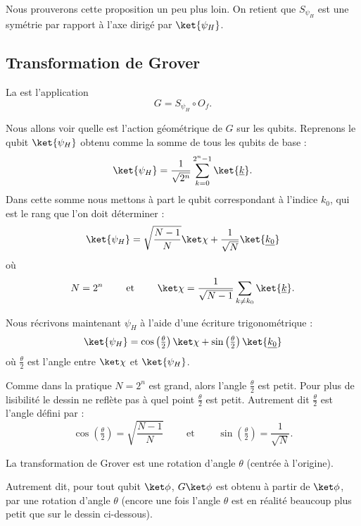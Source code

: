 \documentclass[11pt,class=report,crop=false]{standalone}
\begin{document}
Nous prouverons cette proposition un peu plus loin. On retient que $S_{\psi_H}$ est une symétrie par rapport à l'axe dirigé par $\ket{\psi_H}$.





\subsection{Transformation de Grover}

La  est l'application 
$$G = S_{\psi_H} \circ O_f.$$


Nous allons voir quelle est l'action géométrique de $G$ sur les qubits.
Reprenons le qubit $\ket{\psi_H}$ obtenu comme la somme de tous les qubits de base :
$$\ket{\psi_H} = \frac{1}{\sqrt{2^n}} \sum_{k=0}^{2^n-1} \ket{\underline{k}}.$$
Dans cette somme nous mettons à part le qubit correspondant à l'indice $k_0$, qui est le rang que l'on doit déterminer :
$$\ket{\psi_H} = \sqrt{\frac{N-1}{N}} \ket\chi + \frac{1}{\sqrt{N}} \ket{\underline{k_0}}$$
où
$$N = 2^n \qquad \text{ et } \qquad  \ket\chi = \frac{1}{\sqrt{N-1}} \sum_{k\neq k_0} \ket{\underline{k}}.$$

Nous récrivons maintenant $\psi_H$ à l'aide d'une écriture trigonométrique :
$$\ket{\psi_H} = \cos\left(\tfrac\theta2\right) \ket\chi + \sin\left(\tfrac\theta2\right) \ket{\underline{k_0}}$$
où $\frac\theta2$ est l'angle entre $\ket\chi$ et $\ket{\psi_H}$.


Comme dans la pratique $N=2^n$ est grand, alors l'angle $\frac\theta2$ est petit. Pour plus de lisibilité le dessin ne reflète pas à quel point $\frac\theta2$ est petit.
Autrement dit $\frac\theta2$ est l'angle défini par :
$$\cos \left(\tfrac\theta2\right) = \sqrt{\frac{N-1}{N}}\qquad \text{ et } \qquad \sin \left(\tfrac\theta2\right) = \frac{1}{\sqrt{N}}.$$

\begin{proposition}
La transformation de Grover est une rotation d'angle $\theta$ (centrée à l'origine).
\end{proposition}

Autrement dit, pour tout qubit $\ket\phi$, $G\ket\phi$ est obtenu à partir de $\ket\phi$, par une rotation d'angle $\theta$ (encore une fois l'angle $\theta$ est en réalité beaucoup plus petit que sur le dessin ci-dessous).
\end{document}
